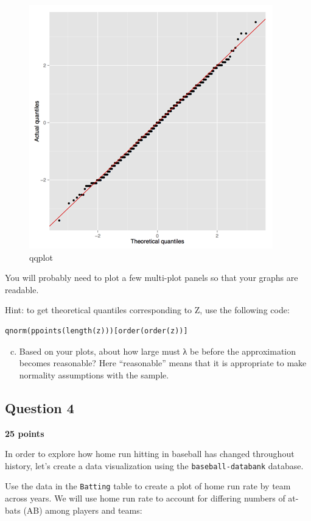 \documentclass[]{article}
\makeatletter
\def\maxwidth{\ifdim\Gin@nat@width>\linewidth\linewidth
\else\Gin@nat@width\fi}
\let\Oldincludegraphics\includegraphics
\renewcommand{\includegraphics}[1]{\Oldincludegraphics[width=\maxwidth]{#1}}
\makeatother
\begin{document}
\begin{figure}[htbp]
\centering
\includegraphics{qqplot.png}
\caption{qqplot}
\end{figure}

You will probably need to plot a few multi-plot panels so that your
graphs are readable.

Hint: to get theoretical quantiles corresponding to Z, use the following
code:

\begin{verbatim}
qnorm(ppoints(length(z)))[order(order(z))]
\end{verbatim}

\begin{enumerate}[a.]
\setcounter{enumi}{2}
\item
  Based on your plots, about how large must λ be before the
  approximation becomes reasonable? Here ``reasonable'' means that it is
  appropriate to make normality assumptions with the sample.
\end{enumerate}

\subsection{Question 4}

\textbf{25 points}

In order to explore how home run hitting in baseball has changed
throughout history, let's create a data visualization using the
\texttt{baseball-databank} database.

Use the data in the \texttt{Batting} table to create a plot of home run
rate by team across years. We will use home run rate to account for
differing numbers of at-bats (AB) among players and teams:
\end{document}
